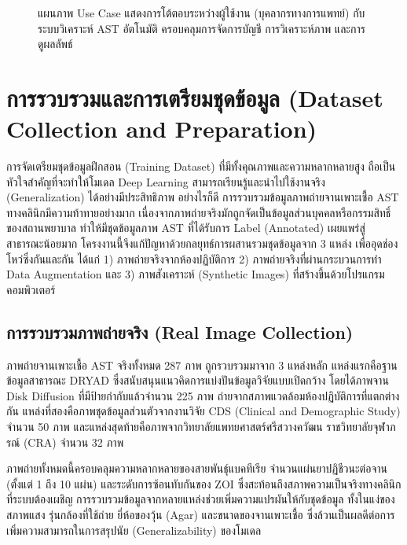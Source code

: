 \begin{figure}[H]
  \centering
  \caption{แผนภาพ Use Case แสดงการโต้ตอบระหว่างผู้ใช้งาน (บุคลากรทางการแพทย์)
    กับระบบวิเคราะห์ AST อัตโนมัติ ครอบคลุมการจัดการบัญชี การวิเคราะห์ภาพ และการดูผลลัพธ์}
  \label{fig:use_case}
\end{figure}

\section{การรวบรวมและการเตรียมชุดข้อมูล (Dataset Collection and Preparation)}

การจัดเตรียมชุดข้อมูลฝึกสอน (Training Dataset) ที่มีทั้งคุณภาพและความหลากหลายสูง ถือเป็นหัวใจสำคัญที่จะทำให้โมเดล Deep Learning สามารถเรียนรู้และนำไปใช้งานจริง (Generalization) ได้อย่างมีประสิทธิภาพ อย่างไรก็ดี การรวบรวมข้อมูลภาพถ่ายจานเพาะเชื้อ AST ทางคลินิกมีความท้าทายอย่างมาก เนื่องจากภาพถ่ายจริงมักถูกจัดเป็นข้อมูลส่วนบุคคลหรือกรรมสิทธิ์ของสถานพยาบาล ทำให้มีชุดข้อมูลภาพ AST ที่ได้รับการ Label (Annotated) เผยแพร่สู่สาธารณะน้อยมาก โครงงานนี้จึงแก้ปัญหาด้วยกลยุทธ์การผสานรวมชุดข้อมูลจาก 3 แหล่ง เพื่ออุดช่องโหว่ซึ่งกันและกัน ได้แก่ 1) ภาพถ่ายจริงจากห้องปฏิบัติการ 2) ภาพถ่ายจริงที่ผ่านกระบวนการทำ Data Augmentation และ 3) ภาพสังเคราะห์ (Synthetic Images) ที่สร้างขึ้นด้วยโปรแกรมคอมพิวเตอร์

\subsection{การรวบรวมภาพถ่ายจริง (Real Image Collection)}

ภาพถ่ายจานเพาะเชื้อ AST จริงทั้งหมด 287 ภาพ ถูกรวบรวมมาจาก 3 แหล่งหลัก แหล่งแรกคือฐานข้อมูลสาธารณะ DRYAD \cite{giske2024dryad} ซึ่งสนับสนุนแนวคิดการแบ่งปันข้อมูลวิจัยแบบเปิดกว้าง \cite{iom1996} โดยได้ภาพจาน Disk Diffusion ที่มีป้ายกำกับแล้วจำนวน 225 ภาพ ถ่ายจากสภาพแวดล้อมห้องปฏิบัติการที่แตกต่างกัน แหล่งที่สองคือภาพชุดข้อมูลส่วนตัวจากงานวิจัย CDS (Clinical and Demographic Study) จำนวน 50 ภาพ และแหล่งสุดท้ายคือภาพจากวิทยาลัยแพทยศาสตร์ศรีสวางควัฒน ราชวิทยาลัยจุฬาภรณ์ (CRA) จำนวน 32 ภาพ

ภาพถ่ายทั้งหมดนี้ครอบคลุมความหลากหลายของสายพันธุ์แบคทีเรีย จำนวนแผ่นยาปฏิชีวนะต่อจาน (ตั้งแต่ 1 ถึง 10 แผ่น) และระดับการซ้อนทับกันของ ZOI ซึ่งสะท้อนถึงสภาพความเป็นจริงทางคลินิกที่ระบบต้องเผชิญ การรวบรวมข้อมูลจากหลายแหล่งช่วยเพิ่มความแปรผันให้กับชุดข้อมูล ทั้งในแง่ของสภาพแสง รุ่นกล้องที่ใช้ถ่าย ยี่ห้อของวุ้น (Agar) และขนาดของจานเพาะเชื้อ ซึ่งล้วนเป็นผลดีต่อการเพิ่มความสามารถในการสรุปนัย (Generalizability) ของโมเดล

